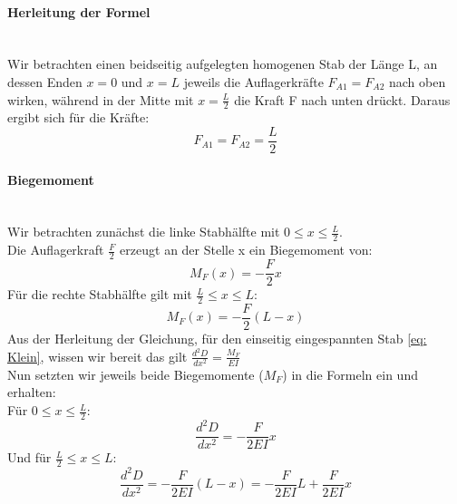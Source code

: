 \paragraph{Herleitung der Formel}\mbox{}\\
Wir betrachten einen beidseitig aufgelegten homogenen Stab der Länge L, an dessen Enden $x=0$ und $x=L$ jeweils die Auflagerkräfte $F_{A1}= F_{A2}$ nach oben wirken, während in der Mitte mit $x = \frac{L}{2}$ die Kraft F nach unten drückt. Daraus ergibt sich für die Kräfte:\\
\begin{equation}
   F_{A1}= F_{A2} = \frac{L}{2}
\end{equation}
\paragraph{Biegemoment}\mbox{}\\
Wir betrachten zunächst die linke Stabhälfte mit  $0 \leq x \leq \frac{L}{2}$.\\ 
Die Auflagerkraft $\frac{F}{2}$  erzeugt an der Stelle x ein Biegemoment von:\\ 
\begin{equation}
   M_F(x) = - \frac{F}{2} x
\end{equation}
Für die rechte Stabhälfte gilt mit $ \frac{L}{2} \leq x \leq L$:\\ 
\begin{equation}
   M_F(x) = - \frac{F}{2} (L-x)
\end{equation}
Aus der Herleitung der Gleichung, für den einseitig eingespannten Stab  \ref{eq: Klein}, wissen wir bereit das gilt $ \frac{d^2 D}{dx^2} =\frac{M_F}{EI}$\\ 
Nun setzten wir jeweils beide Biegemomente ($M_F$) in die Formeln ein und erhalten:\\ 
Für $0 \leq x \leq \frac{L}{2}$:\\ 
\begin{equation}
  \frac{d^2 D}{dx^2} = - \frac{F}{2EI} x
  \label{eq: Biegung21}
\end{equation}
Und für $ \frac{L}{2} \leq x \leq L$:\\ 
\begin{equation}
  \frac{d^2 D}{dx^2} = - \frac{F}{2EI} (L - x) = - \frac{F}{2EI} L + \frac{F}{2EI} x
  \label{eq: Biegung22}
\end{equation}
